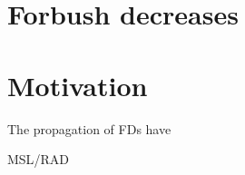 \section{Forbush decreases}



\section{Motivation}

The propagation of 
\acp{FD} have 

\ac{MSL}/\ac{RAD}